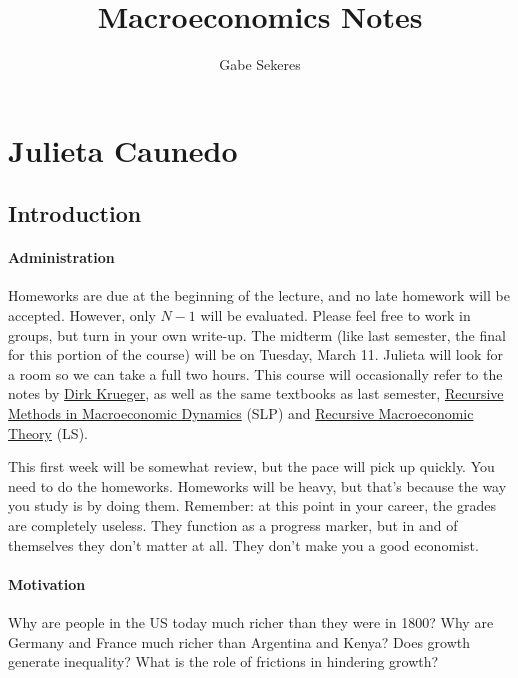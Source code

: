 \documentclass[10pt]{article}
\title{Macroeconomics Notes}
\author{Gabe Sekeres}
\begin{document}
\maketitle

\tableofcontents
\newpage


\section{Julieta Caunedo}

\subsection{Introduction}

\paragraph{Administration}

Homeworks are due at the beginning of the lecture, and no late homework will be accepted. However, only $N-1$ will be evaluated. Please feel free to work in groups, but turn in your own write-up. The midterm (like last semester, the final for this portion of the course) will be on Tuesday, March 11. Julieta will look for a room so we can take a full two hours. This course will occasionally refer to the notes by \href{https://perhuaman.wordpress.com/wp-content/uploads/2014/06/macrotheory-dirk-krueger.pdf}{Dirk Krueger}, as well as the same textbooks as last semester, \href{https://www.hup.harvard.edu/books/9780674750968}{Recursive Methods in Macroeconomic Dynamics} (SLP) and \href{https://www.sfu.ca/~kkasa/Recursive_Macroeconomic_Theory_Ljungqvist_Sargent_2018.pdf}{Recursive Macroeconomic Theory} (LS). 

This first week will be somewhat review, but the pace will pick up quickly. You need to do the homeworks. Homeworks will be heavy, but that's because the way you study is by doing them. Remember: at this point in your career, the grades are completely useless. They function as a progress marker, but in and of themselves they don't matter at all. They don't make you a good economist. 

\paragraph{Motivation}

Why are people in the US today much richer than they were in 1800? Why are Germany and France much richer than Argentina and Kenya? Does growth generate inequality? What is the role of frictions in hindering growth? 
\end{document}
